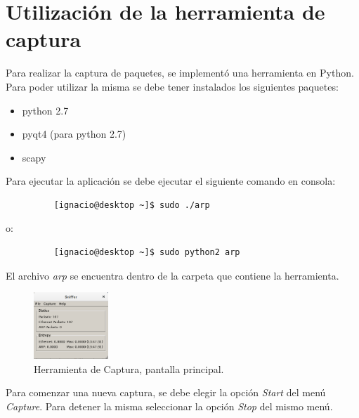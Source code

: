 
\section{Utilización de la herramienta de captura}

Para realizar la captura de paquetes, se implementó una herramienta en Python. Para poder utilizar la misma se debe tener instalados los siguientes paquetes:

\begin{itemize}
	\item python 2.7
	\item pyqt4 (para python 2.7)
	\item scapy
\end{itemize}

Para ejecutar la aplicación se debe ejecutar el siguiente comando en consola:

\begin{figure}[h!]
	\centering
	\begin{lstlisting}
	[ignacio@desktop ~]$ sudo ./arp
	\end{lstlisting}
\end{figure}

o:


\begin{figure}[h!]
	\centering
	\begin{lstlisting}
	[ignacio@desktop ~]$ sudo python2 arp
	\end{lstlisting}
\end{figure}

El archivo \emph{arp} se encuentra dentro de la carpeta que contiene la herramienta.

\begin{figure}[h!]
	\caption{Herramienta de Captura, pantalla principal.}
	\centering
	\includegraphics[width=0.25\textwidth]{graficos/tool/tool}
\end{figure}

Para comenzar una nueva captura, se debe elegir la opción \emph{Start} del menú \emph{Capture}. Para detener la misma seleccionar la opción \emph{Stop} del mismo menú.


